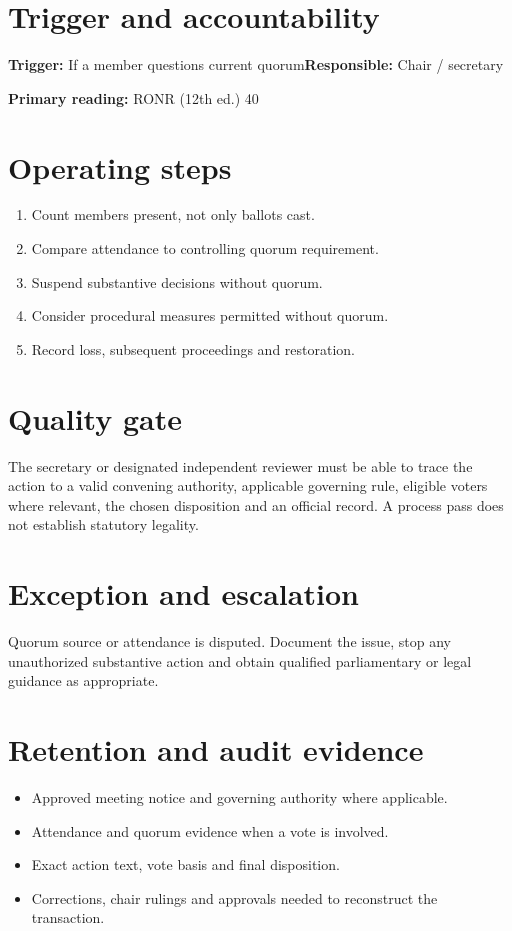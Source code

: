 \documentclass[11pt]{article}
\begin{document}
\SuiteOpen
{}
\section{Trigger and accountability}
\textbf{Trigger:} If a member questions current quorum\quad\textbf{Responsible:} Chair / secretary

\textbf{Primary reading:} RONR (12th ed.) 40

\section{Operating steps}
\begin{enumerate}[leftmargin=*,itemsep=4pt]
\item Count members present, not only ballots cast.
\item Compare attendance to controlling quorum requirement.
\item Suspend substantive decisions without quorum.
\item Consider procedural measures permitted without quorum.
\item Record loss, subsequent proceedings and restoration.
\end{enumerate}

\section{Quality gate}
The secretary or designated independent reviewer must be able to trace the action to a valid convening authority, applicable governing rule, eligible voters where relevant, the chosen disposition and an official record. A process pass does not establish statutory legality.

\section{Exception and escalation}
Quorum source or attendance is disputed. Document the issue, stop any unauthorized substantive action and obtain qualified parliamentary or legal guidance as appropriate.

\section{Retention and audit evidence}
\begin{itemize}[leftmargin=*,itemsep=4pt]
\item Approved meeting notice and governing authority where applicable.
\item Attendance and quorum evidence when a vote is involved.
\item Exact action text, vote basis and final disposition.
\item Corrections, chair rulings and approvals needed to reconstruct the transaction.
\end{itemize}
\end{document}
